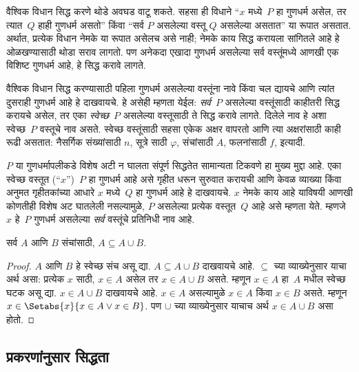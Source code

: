 वैश्विक विधान सिद्ध करणे थोडे अवघड वाटू शकते. सहसा ही विधाने “$x$ मध्ये~$P$ हा गुणधर्म असेल, तर त्यात~$Q$ हाही गुणधर्म असतो” किंवा “सर्व $P$ असलेल्या वस्तू $Q$ असलेल्या असतात” या रूपात असतात. अर्थात, प्रत्येक विधान नेमके या रूपात असेलच असे नाही; नेमके काय सिद्ध करायला सांगितले आहे हे ओळखण्यासाठी थोडा सराव लागतो. पण अनेकदा एखादा गुणधर्म असलेल्या सर्व वस्तूंमध्ये आणखी एक विशिष्ट गुणधर्म आहे, हे सिद्ध करावे लागते.

वैश्विक विधान सिद्ध करण्यासाठी पहिला गुणधर्म असलेल्या वस्तूंना नावे किंवा चल द्यायचे आणि त्यांत दुसराही गुणधर्म आहे हे दाखवायचे. हे असेही म्हणता येईल: \emph{सर्व}~$P$ असलेल्या वस्तूंसाठी काहीतरी सिद्ध करायचे असेल, तर एका \emph{स्वेच्छ}~$P$ असलेल्या वस्तूसाठी ते सिद्ध करावे लागते. दिलेले नाव हे अशा स्वेच्छ~$P$ वस्तूचे नाव असते. स्वेच्छ वस्तूंसाठी सहसा एकेक अक्षर वापरतो आणि त्या अक्षरांसाठी काही रूढी असतात: नैसर्गिक संख्यांसाठी $n$, सूत्रे साठी $\varphi$, संचांसाठी $A$, फलनांसाठी $f$, इत्यादी.

$P$ या गुणधर्मापलीकडे विशेष अटी न घालता संपूर्ण सिद्धतेत सामान्यता टिकवणे हा मुख्य मुद्दा आहे. एका स्वेच्छ वस्तूत (“$x$”)~$P$ हा गुणधर्म आहे असे गृहीत धरून सुरुवात करायची आणि केवळ व्याख्या किंवा अनुमत गृहीतकांच्या आधारे $x$ मध्ये~$Q$ हा गुणधर्म आहे हे दाखवायचे. $x$ नेमके काय आहे याविषयी आणखी कोणतीही विशेष अट घातलेली नसल्यामुळे, $P$ असलेल्या प्रत्येक वस्तूत~$Q$ आहे असे म्हणता येते. म्हणजे $x$ हे~$P$ गुणधर्म असलेल्या \emph{सर्व} वस्तूंचे प्रतिनिधी नाव आहे.

\begin{prop}
सर्व $A$ आणि $B$ संचांसाठी, $A \subseteq A \cup B$.
\end{prop}

\begin{proof}
$A$ आणि $B$ हे स्वेच्छ संच असू द्या. $A \subseteq A \cup B$ दाखवायचे आहे. $\subseteq$ च्या व्याख्येनुसार याचा अर्थ असा: प्रत्येक $x$ साठी, $x \in A$ असेल तर $x \in A \cup B$ असते. म्हणून $x \in A$ हा~$A$ मधील स्वेच्छ घटक असू द्या. $x \in A \cup B$ दाखवायचे आहे. $x \in A$ असल्यामुळे $x \in A$ किंवा $x \in B$ असते. म्हणून $x \in \Setabs{x}{x \in A \lor x \in B}$. पण $\cup$ च्या व्याख्येनुसार याचाच अर्थ $x \in A \cup B$ असा होतो.
\end{proof}

\subsection{प्रकरणांनुसार सिद्धता}

